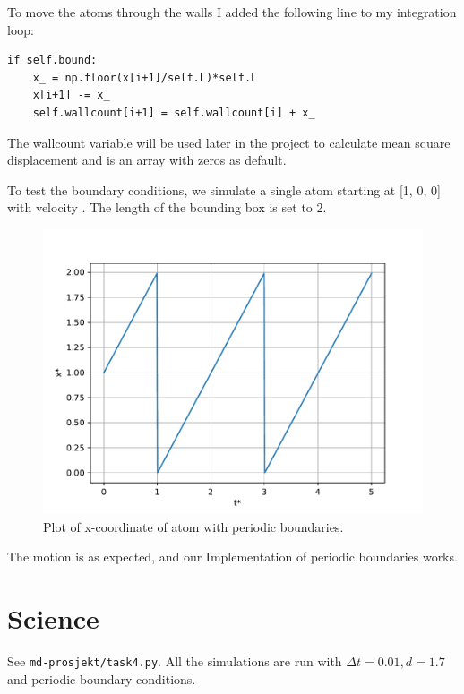 \documentclass[a4paper,10pt,english]{article}
\begin{document}
To move the atoms through the walls I added the following line to my integration loop:
\begin{lstlisting}
if self.bound:
    x_ = np.floor(x[i+1]/self.L)*self.L
    x[i+1] -= x_
    self.wallcount[i+1] = self.wallcount[i] + x_
\end{lstlisting}
The wallcount variable will be used later in the project to calculate mean square displacement and is an array with zeros as default.

\newpage

To test the boundary conditions, we simulate a single atom starting at [1, 0, 0] with velocity \newline [1, 0, 0]. The length of the bounding box is set to 2.

\begin{figure}[h!]
    \centering
    \includegraphics[scale=0.65]{../figures/3_e.pdf}
    \caption{Plot of x-coordinate of atom with periodic boundaries.}
    \label{fig:boundaries}
\end{figure}

The motion is as expected, and our Implementation of periodic boundaries works.

\newpage

\section{Science} \label{4}

See \verb|md-prosjekt/task4.py|. All the simulations are run with $\Delta t = 0.01, d=1.7$ and periodic boundary conditions.
\end{document}

